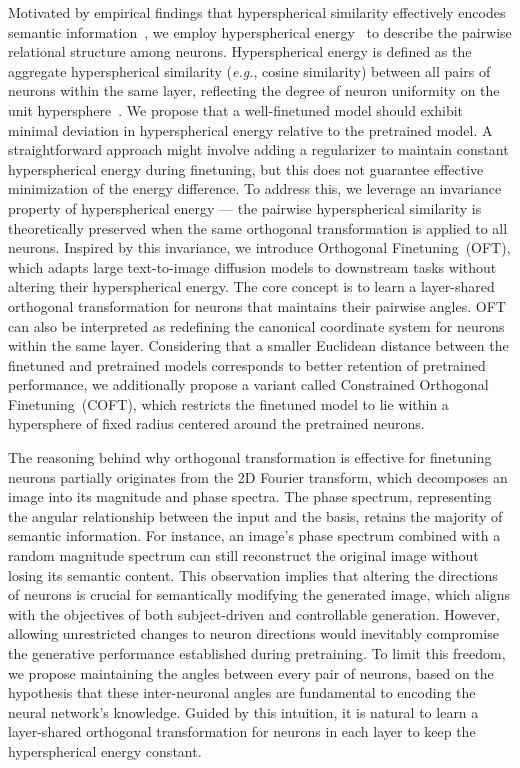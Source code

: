 Motivated by empirical findings that hyperspherical similarity effectively encodes semantic information~\cite{liu2017deep,liu2018decoupled,chen2020angular}, we employ hyperspherical energy~\cite{liu2018learning} to describe the pairwise relational structure among neurons. Hyperspherical energy is defined as the aggregate hyperspherical similarity (\emph{e.g.}, cosine similarity) between all pairs of neurons within the same layer, reflecting the degree of neuron uniformity on the unit hypersphere~\cite{liu2021learning}. We propose that a well-finetuned model should exhibit minimal deviation in hyperspherical energy relative to the pretrained model. A straightforward approach might involve adding a regularizer to maintain constant hyperspherical energy during finetuning, but this does not guarantee effective minimization of the energy difference. To address this, we leverage an invariance property of hyperspherical energy — the pairwise hyperspherical similarity is theoretically preserved when the same orthogonal transformation is applied to all neurons. Inspired by this invariance, we introduce Orthogonal Finetuning~(OFT), which adapts large text-to-image diffusion models to downstream tasks without altering their hyperspherical energy. The core concept is to learn a layer-shared orthogonal transformation for neurons that maintains their pairwise angles. OFT can also be interpreted as redefining the canonical coordinate system for neurons within the same layer. Considering that a smaller Euclidean distance between the finetuned and pretrained models corresponds to better retention of pretrained performance, we additionally propose a variant called Constrained Orthogonal Finetuning~(COFT), which restricts the finetuned model to lie within a hypersphere of fixed radius centered around the pretrained neurons.

The reasoning behind why orthogonal transformation is effective for finetuning neurons partially originates from the 2D Fourier transform, which decomposes an image into its magnitude and phase spectra. The phase spectrum, representing the angular relationship between the input and the basis, retains the majority of semantic information. For instance, an image’s phase spectrum combined with a random magnitude spectrum can still reconstruct the original image without losing its semantic content. This observation implies that altering the directions of neurons is crucial for semantically modifying the generated image, which aligns with the objectives of both subject-driven and controllable generation. However, allowing unrestricted changes to neuron directions would inevitably compromise the generative performance established during pretraining. To limit this freedom, we propose maintaining the angles between every pair of neurons, based on the hypothesis that these inter-neuronal angles are fundamental to encoding the neural network’s knowledge. Guided by this intuition, it is natural to learn a layer-shared orthogonal transformation for neurons in each layer to keep the hyperspherical energy constant.

